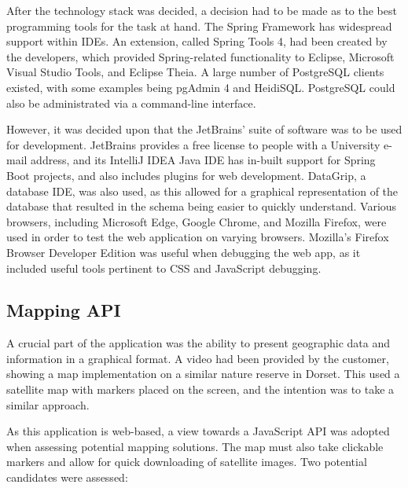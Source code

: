 After the technology stack was decided, a decision had to be made as to the best programming tools for the task at hand. The Spring Framework has widespread support within IDEs. An extension, called Spring Tools 4, had been created by the developers, which provided Spring-related functionality to Eclipse, Microsoft Visual Studio Tools, and Eclipse Theia\cite{SpringTools}. A large number of PostgreSQL clients existed, with some examples being pgAdmin 4 and HeidiSQL. PostgreSQL could also be administrated via a command-line interface\cite{PostgresTools}.

However, it was decided upon that the JetBrains' suite of software was to be used for development. JetBrains provides a free license to people with a University e-mail address\cite{JetBrainsStudent}, and its IntelliJ IDEA Java IDE has in-built support for Spring Boot projects, and also includes plugins for web development. DataGrip, a database IDE, was also used, as this allowed for a graphical representation of the database that resulted in the schema being easier to quickly understand. Various browsers, including Microsoft Edge, Google Chrome, and Mozilla Firefox, were used in order to test the web application on varying browsers. Mozilla's Firefox Browser Developer Edition was useful when debugging the web app, as it included useful tools pertinent to CSS and JavaScript debugging\cite{Mozilla}.

\subsection{Mapping API}

A crucial part of the application was the ability to present geographic data and information in a graphical format. A video had been provided by the customer, showing a map implementation on a similar nature reserve in Dorset. This used a satellite map with markers placed on the screen, and the intention was to take a similar approach\cite{OspreyVideo}.

As this application is web-based, a view towards a JavaScript API was adopted when assessing potential mapping solutions. The map must also take clickable markers and allow for quick downloading of satellite images. Two potential candidates were assessed:

